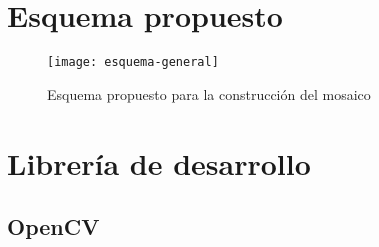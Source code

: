 \section{Esquema propuesto}

\begin{figure}[H]
	\centerline{
		\texttt{[image: esquema-general]}}
		\caption{Esquema propuesto para la construcción del mosaico}
	
	\label{imagen:esquema}
\end{figure}

\section{Librería de desarrollo}

\subsection{OpenCV}